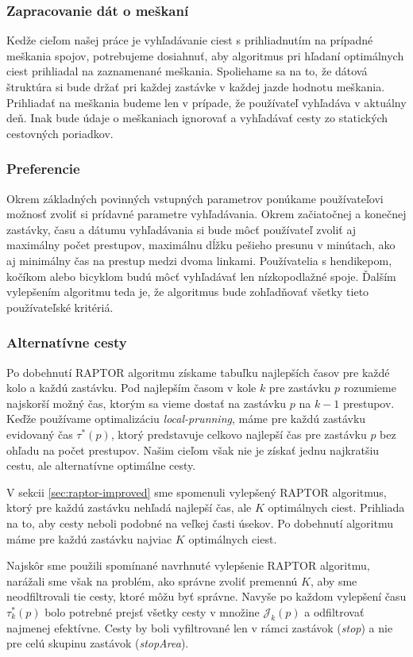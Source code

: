 \subsubsection{Zapracovanie dát o meškaní}
Kedže cieľom našej práce je vyhľadávanie ciest s prihliadnutím na prípadné meškania spojov, potrebujeme dosiahnuť, aby algoritmus pri hľadaní optimálnych ciest prihliadal na zaznamenané meškania. Spoliehame sa na to, že dátová štruktúra si bude držať pri každej zastávke v každej jazde hodnotu meškania. Prihliadať na meškania budeme len v prípade, že používateľ vyhľadáva v aktuálny deň. Inak bude údaje o meškaniach ignorovať a vyhľadávať cesty zo statických cestovných poriadkov.

\subsubsection{Preferencie}
Okrem základných povinných vstupných parametrov ponúkame používateľovi možnosť zvoliť si prídavné parametre vyhľadávania. Okrem začiatočnej a konečnej zastávky, času a dátumu vyhľadávania si bude môcť používateľ zvoliť aj maximálny počet prestupov, maximálnu dĺžku pešieho presunu v minútach, ako aj minimálny čas na prestup medzi dvoma linkami. Používatelia s hendikepom, kočíkom alebo bicyklom budú môcť vyhľadávať len nízkopodlažné spoje. Ďalším vylepšením algoritmu teda je, že algoritmus bude zohľadňovať všetky tieto používateľské kritériá. 

\subsubsection{Alternatívne cesty}
Po dobehnutí RAPTOR algoritmu získame tabuľku najlepších časov pre každé kolo a každú zastávku. Pod najlepším časom v kole $k$ pre zastávku $p$ rozumieme najskorší možný čas, ktorým sa vieme dostať na zastávku $p$ na $k-1$ prestupov. Keďže používame optimalizáciu \textit{local-prunning}, máme pre každú zastávku evidovaný čas $\tau^*(p)$, ktorý predstavuje celkovo najlepší čas pre zastávku $p$ bez ohľadu na počet prestupov. Našim cieľom však nie je získať jednu najkratšiu cestu, ale alternatívne optimálne cesty.

V sekcii \ref{sec:raptor-improved} sme spomenuli vylepšený RAPTOR algoritmus, ktorý pre každú zastávku nehľadá najlepší čas, ale $K$ optimálnych ciest. Prihliada na to, aby cesty neboli podobné na veľkej časti úsekov. Po dobehnutí algoritmu máme pre každú zastávku najviac $K$ optimálnych ciest.

Najskôr sme použili spomínané navrhnuté vylepšenie RAPTOR algoritmu, narážali sme však na problém, ako správne zvoliť premennú $K$, aby sme neodfiltrovali tie cesty, ktoré môžu byť správne. Navyše po každom vylepšení času $\tau^*_k(p)$ bolo potrebné prejsť všetky cesty v množine $\mathcal{J}_k(p)$ a odfiltrovať najmenej efektívne. Cesty by boli vyfiltrované len v rámci zastávok (\textit{stop}) a nie pre celú skupinu zastávok (\textit{stopArea}).

